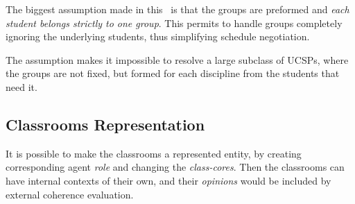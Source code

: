 \documentclass[ThesisDoc]{subfiles}
\begin{document}
The biggest assumption made in this \thisdoc\ is that the groups are preformed
and \emph{each student belongs strictly to one group}. This permits to handle
groups completely ignoring the underlying students, thus simplifying schedule
negotiation.

The assumption makes it impossible to resolve a large subclass of UCSPs, where
the groups are not fixed, but formed for each discipline from the students
that need it.




\subsection{Classrooms Representation}
It is possible to make the classrooms a represented entity, by creating
corresponding agent \emph{role} and changing the \emph{class-cores}.
Then the classrooms can have internal contexts of their own, and their
\emph{opinions} would be included by external coherence evaluation.
\end{document}
